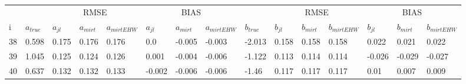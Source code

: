\begin{table}
	\renewcommand{\arraystretch}{1}%
	\footnotesize
	\centering \begin{tabular}{|l|l|lll|lll|l|lll|lll}
		& &  \multicolumn{3}{c}{RMSE}& \multicolumn{3}{c}{BIAS}& & \multicolumn{3}{c}{RMSE}& \multicolumn{3}{c}{BIAS} \\
		i & $a_{true}$ & $a_{jl}$ & $a_{mirt}$ & $a_{mirt EHW}$ & $ a_{jl} $ & $ a_{mirt} $ & $ a_{mirt EHW} $ & $ b_{true} $ & $ b_{jl} $ & $ b_{mirt} $ & $ b_{mirt EHW} $ & $ b_{jl} $ & $b_{mirt}$ & $b_{mirt EHW}$\\
		\hline
		38 & 0.598 & 0.175 & 0.176 & 0.176 & 0.0 & -0.005 & -0.003 & -2.013 & 0.158 & 0.158 & 0.158 & 0.022 & 0.021 & 0.022 \\
		39 & 1.045 & 0.125 & 0.124 & 0.126 & 0.001 & -0.004 & -0.006 & -1.122 & 0.113 & 0.114 & 0.114 & -0.026 & -0.029 & -0.027 \\
		40 & 0.637 & 0.132 & 0.132 & 0.133 & -0.002 & -0.006 & -0.006 & -1.46 & 0.117 & 0.117 & 0.117 & 0.01 & 0.007 & 0.009 	\\
		

\end{tabular}
\end{table}
